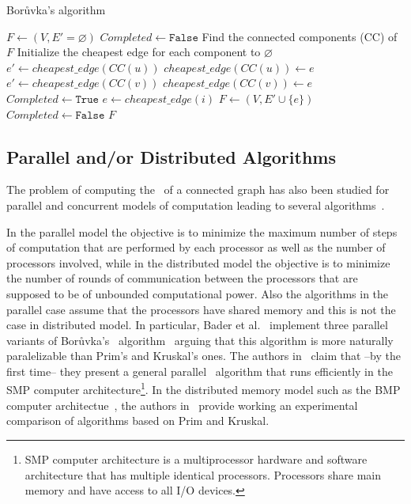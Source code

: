 \begin{algorithm}
\caption{Bor\r{u}vka's algorithm \label{alg:boruvka}}
\begin{algorithmic}
        \State $F \gets (V, E' = \varnothing)$
        \State $Completed \gets \texttt{False}$
            \State Find the connected components (CC) of $F$
            \State Initialize the cheapest edge for each component to $\varnothing$
                \State $e' \gets cheapest\_edge(CC(u))$
                    \State $cheapest\_edge(CC(u)) \gets e$
                \EndIf
                \State $e' \gets cheapest\_edge(CC(v))$
                    \State $cheapest\_edge(CC(v)) \gets e$
                \EndIf
            \EndFor
            \State $Completed \gets \texttt{True}$
                \State $e \gets cheapest\_edge(i)$
                    \State $F \gets (V, E' \cup \{e\})$
                    \State $Completed \gets \texttt{False}$
                \EndIf
            \EndFor
        \EndWhile
        \State \Return $F$
    \EndProcedure
\end{algorithmic}
\end{algorithm}


\subsection*{Parallel and/or Distributed Algorithms}
The problem of computing the \mst\ of a connected graph has also been studied 
for parallel and concurrent models of computation leading 
to several algorithms~\cite{bader2006fast,durbhakula2020parallel,tripathy2013new}. 

In the parallel model the objective is to minimize the maximum number of steps of 
computation that are performed by each processor as well as the number of processors involved, 
while in the distributed model the objective is to minimize the number of rounds of communication 
between the processors that are supposed to be of unbounded computational power. 
Also the algorithms in the parallel case assume that the processors have shared memory 
and this is not the case in distributed model.
In particular, Bader et al.~\cite{bader2006fast} implement three parallel 
variants of Bor\r{u}vka's \mst\ algorithm~\cite{chung1996parallel} arguing that 
this algorithm is more naturally paralelizable than Prim's and Kruskal's ones. 
The authors in~\cite{bader2006fast} claim that --by the first time-- they 
present a general parallel \mst\ algorithm that runs efficiently in the 
SMP computer architecture\footnote{SMP computer architecture is a multiprocessor hardware and software architecture that has multiple identical processors. 
Processors share main memory and have access to all I/O devices.}. In the distributed
memory model such as the BMP computer architectue~\cite{Valiant1990}, the authors in~\cite{Lonar2014}
provide working an experimental comparison of algorithms based on Prim and Kruskal.

